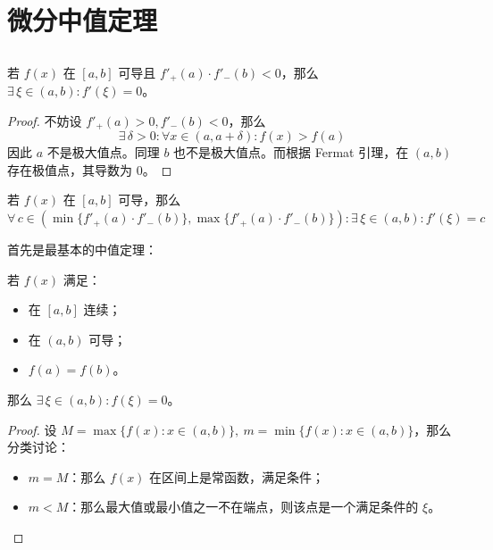 \section{微分中值定理}

\subsection{}

\begin{theorem}[Darboux 定理]
	若 $f(x)$ 在 $[a, b]$ 可导且 $f'_+(a) \cdot f'_-(b) < 0$，那么 $\exists\,\xi \in (a, b): f'(\xi) = 0$。

	\begin{proof}
		不妨设 $f'_+(a) > 0, f'_-(b) < 0$，那么
		$$
		\exists\,\delta > 0: \forall x \in (a, a + \delta): f(x) > f(a)
		$$
		因此 $a$ 不是极大值点。同理 $b$ 也不是极大值点。而根据 Fermat 引理，在 $(a, b)$ 存在极值点，其导数为 $0$。
	\end{proof}
\end{theorem}

\begin{corollary}[导函数的介值性定理]
	若 $f(x)$ 在 $[a, b]$ 可导，那么 $\forall\, c \in (\min\{f'_+(a) \cdot f'_-(b)\}, \max\{f'_+(a) \cdot f'_-(b)\}): \exists\,\xi \in (a, b): f'(\xi) = c$
\end{corollary}

首先是最基本的中值定理：

\begin{theorem}[Rolle 定理]
	若 $f(x)$ 满足：

	\begin{itemize}
		\item 在 $[a, b]$ 连续；
		\item 在 $(a, b)$ 可导；
		\item $f(a) = f(b)$。
	\end{itemize}

	那么 $\exists\,\xi \in (a, b): f(\xi) = 0$。

	\begin{proof}
		设 $M = \max\{f(x): x \in (a, b)\},\ m = \min\{f(x): x \in (a, b)\}$，那么分类讨论：
 
		\begin{itemize}
			\item $m = M$：那么 $f(x)$ 在区间上是常函数，满足条件；
			\item $m < M$：那么最大值或最小值之一不在端点，则该点是一个满足条件的 $\xi$。
		\end{itemize}
	\end{proof}
\end{theorem}

